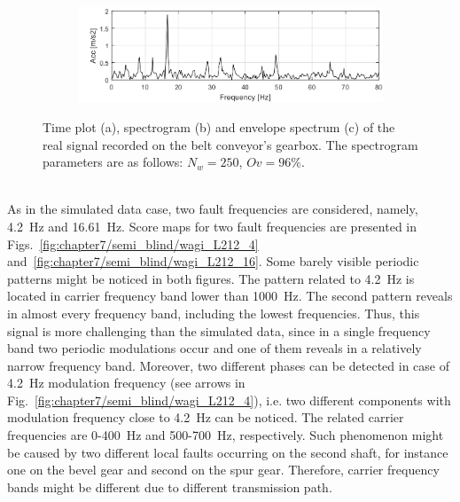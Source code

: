 \begin{figure}
\begin{subfigure}[b]{0.8\textwidth}
        \label{fig:chapter7/semi_blind/spectrogram_L212}
    \end{subfigure}
    \begin{subfigure}[b]{0.8\textwidth}
        \centering
        \captionsetup{skip=0.01pt}
        \caption{}
        \includegraphics[width=\textwidth]{wykresy/chapter_application/semi_blind/widmo_obwiedniL212.png}
        \label{fig:chapter7/semi_blind/obwiednia_L212}
    \end{subfigure}
    \caption{Time plot (a), spectrogram (b) and envelope spectrum (c) of the real signal recorded on the belt conveyor's gearbox. The spectrogram parameters are as follows: $N_w=250$, $Ov=96\%$.}\label{fig:chapter7/semi_blind/time-plot_L212}
\end{figure}
\\
As in the simulated data case, two fault frequencies are considered, namely, 4.2~Hz and 16.61~Hz. Score maps for two fault frequencies are presented in Figs.~\ref{fig:chapter7/semi_blind/wagi_L212_4} and~\ref{fig:chapter7/semi_blind/wagi_L212_16}. Some barely visible periodic patterns might be noticed in both figures. The pattern related to 4.2~Hz is located in carrier frequency band lower than 1000~Hz. The second pattern reveals in almost every frequency band, including the lowest frequencies. Thus, this signal is more challenging than the simulated data, since in a single frequency band two periodic modulations occur and one of them reveals in a relatively narrow frequency band. Moreover, two different phases can be detected in case of 4.2~Hz modulation frequency (see arrows in Fig.~\ref{fig:chapter7/semi_blind/wagi_L212_4}), i.e. two different components with modulation frequency close to 4.2~Hz can be noticed. The related carrier frequencies are 0-400~Hz and 500-700~Hz, respectively. Such phenomenon might be caused by two different local faults occurring on the second shaft, for instance one on the bevel gear and second on the spur gear. Therefore, carrier frequency bands might be different due to different transmission path.
